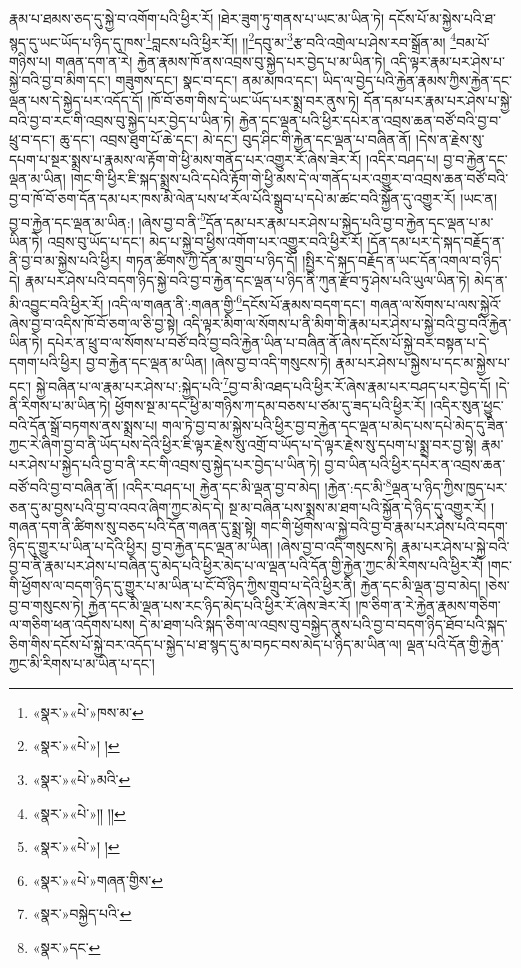 རྣམ་པ་ཐམས་ཅད་དུ་སྐྱེ་བ་འགོག་པའི་ཕྱིར་རོ། །ཐེར་ཟུག་ཏུ་གནས་པ་ཡང་མ་ཡིན་ཏེ། དངོས་པོ་མ་སྐྱེས་པའི་ཐ་སྙད་དུ་ཡང་ཡོད་པ་ཉིད་དུ་ཁས་\footnote{«སྣར་»«པེ་»ཁས་མ་}བླངས་པའི་ཕྱིར་རོ།། །།\footnote{«སྣར་»«པེ་»། །}དབུ་མ་\footnote{«སྣར་»«པེ་»མའི་}རྩ་བའི་འགྲེལ་པ་ཤེས་རབ་སྒྲོན་མ། \footnote{«སྣར་»«པེ་»།། །།}བམ་པོ་གཉིས་པ། གཞན་དག་ན་རེ། རྐྱེན་རྣམས་ཁོ་ནས་འབྲས་བུ་སྐྱེད་པར་བྱེད་པ་མ་ཡིན་ཏེ། འདི་ལྟར་རྣམ་པར་ཤེས་པ་སྐྱེ་བའི་བྱ་བ་མིག་དང་། གཟུགས་དང་། སྣང་བ་དང་། ནམ་མཁའ་དང་། ཡིད་ལ་བྱེད་པའི་རྐྱེན་རྣམས་ཀྱིས་རྐྱེན་དང་ལྡན་པས་དེ་སྐྱེད་པར་འདོད་དོ། །ཁོ་བོ་ཅག་གིས་དེ་ཡང་ཡོད་པར་སྨྲ་བར་ནུས་ཏེ། དོན་དམ་པར་རྣམ་པར་ཤེས་པ་སྐྱེ་བའི་བྱ་བ་རང་གི་འབྲས་བུ་སྐྱེད་པར་བྱེད་པ་ཡིན་ཏེ། རྐྱེན་དང་ལྡན་པའི་ཕྱིར་དཔེར་ན་འབྲས་ཆན་བཙོ་བའི་བྱ་བ་ཕྲུ་བ་དང་། ཆུ་དང་། འབྲས་ཐུག་པོ་ཆེ་དང་། མེ་དང་། བུད་ཤིང་གི་རྐྱེན་དང་ལྡན་པ་བཞིན་ནོ། །དེས་ན་རྗེས་སུ་དཔག་པ་སྔར་སྨྲས་པ་རྣམས་ལ་རྟོག་གེ་ཕྱི་མས་གནོད་པར་འགྱུར་རོ་ཞེས་ཟེར་རོ། །འདིར་བཤད་པ། བྱ་བ་རྐྱེན་དང་ལྡན་མ་ཡིན། །གང་གི་ཕྱིར་ཇི་སྐད་སྨྲས་པའི་དཔེའི་རྟོག་གེ་ཕྱི་མས་དེ་ལ་གནོད་པར་འགྱུར་བ་འབྲས་ཆན་བཙོ་བའི་བྱ་བ་ཁོ་བོ་ཅག་དོན་དམ་པར་ཁས་མི་ལེན་པས་ཕ་རོལ་པོའི་སྒྲུབ་པ་དཔེ་མ་ཚང་བའི་སྐྱོན་དུ་འགྱུར་རོ། །ཡང་ན། བྱ་བ་རྐྱེན་དང་ལྡན་མ་ཡིན:། །ཞེས་བྱ་བ་ནི་\footnote{«སྣར་»«པེ་»། །}དོན་དམ་པར་རྣམ་པར་ཤེས་པ་སྐྱེད་པའི་བྱ་བ་རྐྱེན་དང་ལྡན་པ་མ་ཡིན་ཏེ། འབྲས་བུ་ཡོད་པ་དང་། མེད་པ་སྐྱེ་བ་ཕྱིས་འགོག་པར་འགྱུར་བའི་ཕྱིར་རོ། །དོན་དམ་པར་དེ་སྐད་བརྗོད་ན་ནི་བྱ་བ་མ་སྐྱེས་པའི་ཕྱིར། གཏན་ཚིགས་ཀྱི་དོན་མ་གྲུབ་པ་ཉིད་དོ། །སྤྱིར་དེ་སྐད་བརྗོད་ན་ཡང་དོན་འགལ་བ་ཉིད་དེ། རྣམ་པར་ཤེས་པའི་བདག་ཉིད་སྐྱེ་བའི་བྱ་བ་རྐྱེན་དང་ལྡན་པ་ཉིད་ནི་ཀུན་རྫོབ་ཏུ་ཤེས་པའི་ཡུལ་ཡིན་ཏེ། མེད་ན་མི་འབྱུང་བའི་ཕྱིར་རོ། །འདི་ལ་གཞན་ནི་:གཞན་གྱི་\footnote{«སྣར་»«པེ་»གཞན་གྱིས་}དངོས་པོ་རྣམས་བདག་དང་། གཞན་ལ་སོགས་པ་ལས་སྐྱེའོ་ཞེས་བྱ་བ་འདིས་ཁོ་བོ་ཅག་ལ་ཅི་བྱ་སྟེ། འདི་ལྟར་མིག་ལ་སོགས་པ་ནི་མིག་གི་རྣམ་པར་ཤེས་པ་སྐྱེ་བའི་བྱ་བའི་རྐྱེན་ཡིན་ཏེ། དཔེར་ན་ཕྲུ་བ་ལ་སོགས་པ་བཙོ་བའི་བྱ་བའི་རྐྱེན་ཡིན་པ་བཞིན་ནོ་ཞེས་དངོས་པོ་སྐྱེ་བར་བསྟན་པ་དེ་དགག་པའི་ཕྱིར། བྱ་བ་རྐྱེན་དང་ལྡན་མ་ཡིན། །ཞེས་བྱ་བ་འདི་གསུངས་ཏེ། རྣམ་པར་ཤེས་པ་སྐྱེས་པ་དང་མ་སྐྱེས་པ་དང་། སྐྱེ་བཞིན་པ་ལ་རྣམ་པར་ཤེས་པ་:སྐྱེད་པའི་\footnote{«སྣར་»བསྐྱེད་པའི་}བྱ་བ་མི་འཐད་པའི་ཕྱིར་རོ་ཞེས་རྣམ་པར་བཤད་པར་བྱེད་དོ། །དེ་ནི་རིགས་པ་མ་ཡིན་ཏེ། ཕྱོགས་སྔ་མ་དང་ཕྱི་མ་གཉིས་ཀ་དམ་བཅས་པ་ཙམ་དུ་ཟད་པའི་ཕྱིར་རོ། །འདིར་སུན་ཕྱུང་བའི་དོན་སྒྲོ་བཏགས་ནས་སྨྲས་པ། གལ་ཏེ་བྱ་བ་མ་སྐྱེས་པའི་ཕྱིར་བྱ་བ་རྐྱེན་དང་ལྡན་པ་མེད་པས་དཔེ་མེད་དུ་ཟིན་ཀྱང་རེ་ཞིག་བྱ་བ་ནི་ཡོད་པས་དེའི་ཕྱིར་ཇི་ལྟར་རྗེས་སུ་འགྲོ་བ་ཡོད་པ་དེ་ལྟར་རྗེས་སུ་དཔག་པ་སྨྲ་བར་བྱ་སྟེ། རྣམ་པར་ཤེས་པ་སྐྱེད་པའི་བྱ་བ་ནི་རང་གི་འབྲས་བུ་སྐྱེད་པར་བྱེད་པ་ཡིན་ཏེ། བྱ་བ་ཡིན་པའི་ཕྱིར་དཔེར་ན་འབྲས་ཆན་བཙོ་བའི་བྱ་བ་བཞིན་ནོ། །འདིར་བཤད་པ། རྐྱེན་དང་མི་ལྡན་བྱ་བ་མེད། །རྐྱེན་:དང་མི་\footnote{«སྣར་»དང་}ལྡན་པ་ཉིད་ཀྱིས་ཁྱད་པར་ཅན་དུ་མ་བྱས་པའི་བྱ་བ་འབའ་ཞིག་ཀྱང་མེད་དེ། སྔ་མ་བཞིན་པས་སྨྲས་མ་ཐག་པའི་སྐྱོན་དེ་ཉིད་དུ་འགྱུར་རོ། །གཞན་དག་ནི་ཚིགས་སུ་བཅད་པའི་དོན་གཞན་དུ་སྨྲ་སྟེ། གང་གི་ཕྱོགས་ལ་སྐྱེ་བའི་བྱ་བ་རྣམ་པར་ཤེས་པའི་བདག་ཉིད་དུ་གྱུར་པ་ཡིན་པ་དེའི་ཕྱིར། བྱ་བ་རྐྱེན་དང་ལྡན་མ་ཡིན། །ཞེས་བྱ་བ་འདི་གསུངས་ཏེ། རྣམ་པར་ཤེས་པ་སྐྱེ་བའི་བྱ་བ་ནི་རྣམ་པར་ཤེས་པ་བཞིན་དུ་མེད་པའི་ཕྱིར་མེད་པ་ལ་ལྡན་པའི་དོན་གྱི་རྐྱེན་ཀྱང་མི་རིགས་པའི་ཕྱིར་རོ། །གང་གི་ཕྱོགས་ལ་བདག་ཉིད་དུ་གྱུར་པ་མ་ཡིན་པ་ངོ་བོ་ཉིད་ཀྱིས་གྲུབ་པ་དེའི་ཕྱིར་ནི། རྐྱེན་དང་མི་ལྡན་བྱ་བ་མེད། །ཅེས་བྱ་བ་གསུངས་ཏེ། རྐྱེན་དང་མི་ལྡན་པས་རང་ཉིད་མེད་པའི་ཕྱིར་རོ་ཞེས་ཟེར་རོ། །ཁ་ཅིག་ན་རེ་རྐྱེན་རྣམས་གཅིག་ལ་གཅིག་ཕན་འདོགས་པས། དེ་མ་ཐག་པའི་སྐད་ཅིག་ལ་འབྲས་བུ་བསྐྱེད་ནུས་པའི་བྱ་བ་བདག་ཉིད་ཐོབ་པའི་སྐད་ཅིག་གིས་དངོས་པོ་སྐྱེ་བར་འདོད་པ་སྐྱེད་པ་ཐ་སྙད་དུ་མ་བཏང་བས་མེད་པ་ཉིད་མ་ཡིན་ལ། ལྡན་པའི་དོན་གྱི་རྐྱེན་ཀྱང་མི་རིགས་པ་མ་ཡིན་པ་དང་། 